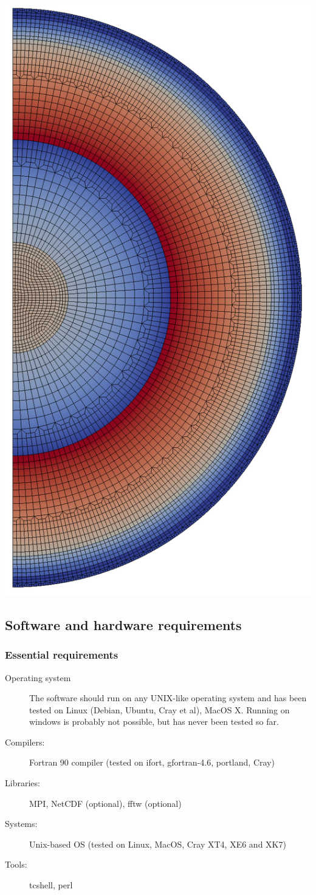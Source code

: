 \documentclass{article}
\begin{document}
\begin{center}
\begin{minipage}[t]{0.25\paperwidth}
        \includegraphics[width=.7\textwidth]{mesh.png}
    \end{minipage}%
\end{center}

\newpage


\subsection{Software and hardware requirements}


\subsubsection{Essential requirements}

\begin{description}
    \item[Operating system] The software should run on any UNIX-like operating system and has
          been tested on Linux (Debian, Ubuntu, Cray et al), MacOS X. Running on windows
          is probably not possible, but has never been tested so far.
    \item[Compilers:] Fortran 90 compiler (tested on ifort, gfortran-4.6, portland, Cray)
    \item[Libraries:] MPI, NetCDF (optional), fftw (optional)
    \item[Systems:] Unix-based OS (tested on Linux, MacOS, Cray XT4, XE6 and XK7)
    \item[Tools:] tcshell, perl
\end{description}\vspace*{0.3cm}
\end{document}

